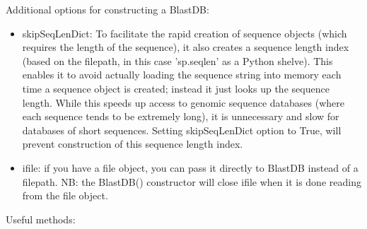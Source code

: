 \documentclass{howto}
\begin{document}
Additional options for constructing a BlastDB:

\begin{itemize}

\item
skipSeqLenDict: To facilitate the rapid creation of sequence objects (which requires the length of the sequence), it also creates a sequence length index (based on the filepath, in this case 'sp.seqlen' as a Python shelve).  This enables it to avoid actually loading the sequence string into memory each time a sequence object is created; instead it just looks up the sequence length.  While this speeds up access to genomic sequence databases (where each sequence tends to be extremely long), it is unnecessary and slow for databases of short sequences.  Setting skipSeqLenDict option to True, will prevent construction of this sequence length index.

\item
ifile: if you have a file object, you can pass it directly to BlastDB instead of a filepath.  NB: the BlastDB() constructor will close ifile when it is done reading from the file object.

\end{itemize}
Useful methods:
\end{document}
